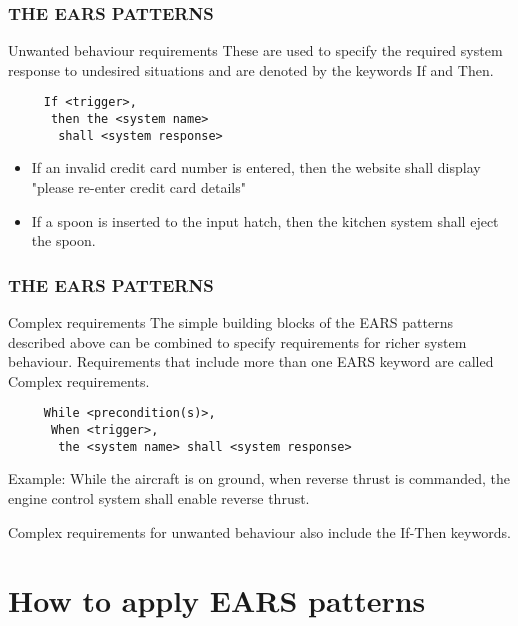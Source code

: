 \documentclass[aspectratio=169]{beamer}
\begin{document}
\begin{frame}[fragile]
  \frametitle{THE EARS PATTERNS}
  \begin{block}{Unwanted behaviour requirements}
    These are used to specify the required system response to undesired situations and are denoted by the keywords If and Then.
    \begin{verbatim}
     If <trigger>, 
      then the <system name> 
       shall <system response> 
    \end{verbatim}
      \end{block}
  
  \begin{example}
  \begin{itemize}
    \item If an invalid credit card number is entered, then the website shall display "please re-enter credit card details"
    \item  If a spoon is inserted to the input hatch, then the kitchen system shall eject the spoon.
  \end{itemize}
  \end{example}
\end{frame}



\begin{frame}[fragile]
  \frametitle{THE EARS PATTERNS}
  \begin{block}{Complex requirements}
  The simple building blocks of the EARS patterns described above can be combined to specify requirements for richer system behaviour. Requirements that include more than one EARS keyword are called Complex requirements.
    \begin{verbatim}
     While <precondition(s)>, 
      When <trigger>, 
       the <system name> shall <system response> 
    \end{verbatim}
    Example: While the aircraft is on ground, when reverse thrust is commanded, the engine control system shall enable reverse thrust.

Complex requirements for unwanted behaviour also include the If-Then keywords.
  \end{block}

\end{frame}

\section*{How to apply EARS patterns}
\end{document}
